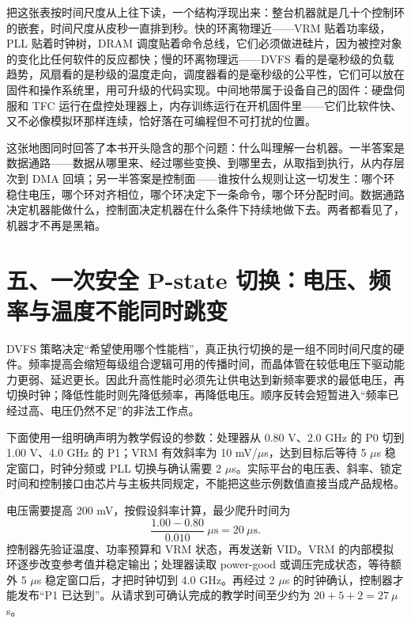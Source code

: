 把这张表按时间尺度从上往下读，一个结构浮现出来：整台机器就是几十个控制环的嵌套，时间尺度从皮秒一直排到秒。快的环离物理近——VRM 贴着功率级，PLL 贴着时钟树，DRAM 调度贴着命令总线，它们必须做进硅片，因为被控对象的变化比任何软件的反应都快；慢的环离物理远——DVFS 看的是毫秒级的负载趋势，风扇看的是秒级的温度走向，调度器看的是毫秒级的公平性，它们可以放在固件和操作系统里，用可升级的代码实现。中间地带属于设备自己的固件：硬盘伺服和 TFC 运行在盘控处理器上，内存训练运行在开机固件里——它们比软件快、又不必像模拟环那样连续，恰好落在可编程但不可打扰的位置。

这张地图同时回答了本书开头隐含的那个问题：什么叫理解一台机器。一半答案是数据通路——数据从哪里来、经过哪些变换、到哪里去，从取指到执行，从内存层次到 DMA 回填；另一半答案是控制面——谁按什么规则让这一切发生：哪个环稳住电压，哪个环对齐相位，哪个环决定下一条命令，哪个环分配时间。数据通路决定机器能做什么，控制面决定机器在什么条件下持续地做下去。两者都看见了，机器才不再是黑箱。
\section{五、一次安全 P-state 切换：电压、频率与温度不能同时跳变}

DVFS 策略决定“希望使用哪个性能档”，真正执行切换的是一组不同时间尺度的硬件。频率提高会缩短每级组合逻辑可用的传播时间，而晶体管在较低电压下驱动能力更弱、延迟更长。因此升高性能时必须先让供电达到新频率要求的最低电压，再切换时钟；降低性能时则先降低频率，再降低电压。顺序反转会短暂进入“频率已经过高、电压仍然不足”的非法工作点。

下面使用一组明确声明为教学假设的参数：处理器从 0.80 V、2.0 GHz 的 P0 切到 1.00 V、4.0 GHz 的 P1；VRM 有效斜率为 10 mV/$\mu$s，达到目标后等待 5 $\mu$s 稳定窗口，时钟分频或 PLL 切换与确认需要 2 $\mu$s。实际平台的电压表、斜率、锁定时间和控制接口由芯片与主板共同规定，不能把这些示例数值直接当成产品规格。


电压需要提高 200 mV，按假设斜率计算，最少爬升时间为
\[
  \frac{1.00-0.80}{0.010}\ \mu\mathrm{s}=20\ \mu\mathrm{s}.
\]
控制器先验证温度、功率预算和 VRM 状态，再发送新 VID。VRM 的内部模拟环逐步改变参考值并稳定输出；处理器读取 power-good 或调压完成状态，等待额外 5 $\mu$s 稳定窗口后，才把时钟切到 4.0 GHz。再经过 2 $\mu$s 的时钟确认，控制器才能发布“P1 已达到”。从请求到可确认完成的教学时间至少约为 $20+5+2=27\ \mu$s。

